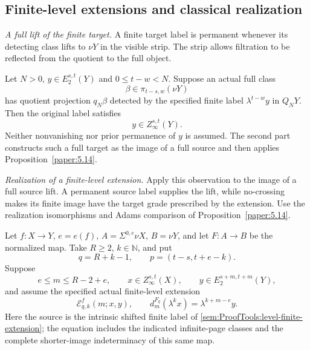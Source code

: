 \subsection{Finite-level extensions and classical realization}


\begin{proposition}
\label{sem:ProofTools:ss-full-lift-permanence}
\label{sem:ProofTools:ss-classical-soundness}

\textit{A full lift of the finite target.}
A finite target label is permanent whenever its detecting class lifts
to $\nu Y$ in the visible strip. The strip allows filtration to be
reflected from the quotient to the full object.

Let $N>0$, $y\in E_2^{s,t}(Y)$ and $0\le t-w<N$. Suppose an actual
full class
\[
\beta\in\pi_{t-s,w}(\nu Y)
\]
has quotient projection $q_N\beta$ detected by the specified finite
label $\lambda^{t-w}y$ in $Q_NY$. Then the original label satisfies
\[
y\in Z_\infty^{s,t}(Y).
\]
Neither nonvanishing nor prior permanence of $y$ is assumed. The second part constructs such a full target as the image of a full
source and then applies Proposition~\ref{paper:5.14}.

\textit{Realization of a finite-level extension.}
Apply this observation to the image of a full source lift. A permanent
source label supplies the lift, while no-crossing makes its finite
image have the target grade prescribed by the extension.
Use the realization isomorphisms and Adams comparison of
Proposition~\ref{paper:5.14}.

Let $f:X\to Y$, $e=e(f)$, $A=\Sigma^{0,e}\nu X$, $B=\nu Y$,
and let $F:A\to B$ be the normalized map. Take $R\ge2$,
$k\in\mathbb N$, and put
\[
q=R+k-1,\qquad p=(t-s,t+e-k).
\]
Suppose
\[
e\le m\le R-2+e,\qquad
x\in Z_\infty^{s,t}(X),\qquad
y\in E_2^{s+m,t+m}(Y),
\]
and assume the specified actual finite-level extension
\[
\mathcal E^f_{q,k}(m;x,y),\qquad
d_m^{F_q}(\lambda^kx)=\lambda^{k+m-e}y.
\]
Here the source is the intrinsic shifted finite label of
\ref{sem:ProofTools:level-finite-extension}; the equation includes
the indicated infinite-page classes and the complete shorter-image
indeterminacy of this same map.


\end{proposition}
